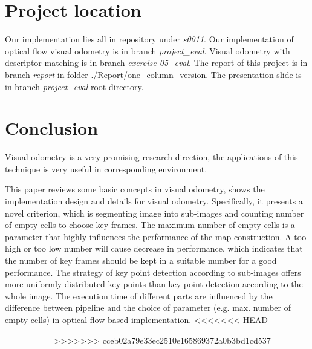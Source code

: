 \documentclass{easychair}
\begin{document}
\section{Project location}
Our implementation lies all in repository under \emph{s0011}. Our implementation of optical flow visual odometry is in branch \emph{project\_eval}. Visual odometry with descriptor matching is in branch \emph{exercise-05\_eval}. The report of this project is in branch \emph{report} in folder ./Report/one\_column\_version. The presentation slide is in branch \emph{project\_eval} root directory.


\section{Conclusion}
Visual odometry is a very promising research direction, the applications of this technique is very useful in corresponding environment.

This paper reviews some basic concepts in visual odometry, shows the implementation design and details for visual odometry. Specifically, it presents a novel criterion, which is segmenting image into sub-images and counting number of empty cells to choose key frames. The maximum number of empty cells is a parameter that highly influences the performance of the map construction. A too high or too low number will cause decrease in performance, which indicates that the number of key frames should be kept in a suitable number for a good performance. The strategy of key point detection according to sub-images offers more uniformly distributed key points than key point detection according to the whole image. The execution time of different parts are influenced by the difference between pipeline and the choice of parameter (e.g. max. number of empty cells) in optical flow based implementation.
<<<<<<< HEAD

=======
>>>>>>> cceb02a79e33ec2510e165869372a0b3bd1cd537
\end{document}
